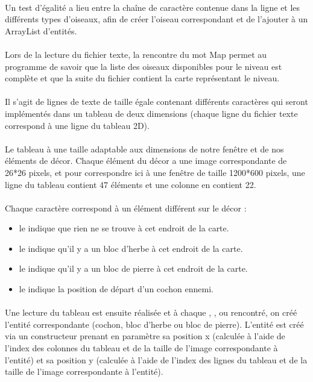 \documentclass[a4paper,12pt]{report}
\begin{document}
\paragraph{}Un test d’égalité a lieu entre la chaîne de caractère contenue dans la ligne et les différents types d’oiseaux, afin de créer l’oiseau correspondant et de l’ajouter à un ArrayList d’entités.
\paragraph{}Lors de la lecture du fichier texte, la rencontre du mot \guillemotleft Map \guillemotright permet au programme de savoir que la liste des oiseaux disponibles pour le niveau est complète et que la suite du fichier contient la carte représentant le niveau.
\paragraph{}Il s’agit de lignes de texte de taille égale contenant différents caractères qui seront implémentés dans un tableau de deux dimensions (chaque ligne du fichier texte correspond à une ligne du tableau 2D).
\paragraph{}Le tableau à une taille adaptable aux dimensions de notre fenêtre et de nos éléments de décor. Chaque élément du décor a une image correspondante de 26*26 pixels, et pour correspondre ici à une fenêtre de taille 1200*600 pixels, une ligne du tableau contient 47 éléments et une colonne en contient 22.
\paragraph{}Chaque caractère correspond à un élément différent sur le décor :
\begin{itemize}
\item le  \guillemotright indique que rien ne se trouve à cet endroit de la carte.
\item le  \guillemotright indique qu’il y a un bloc d’herbe à cet endroit de la carte.
\item le  \guillemotright indique qu’il y a un bloc de pierre à cet endroit de la carte.
\item le  \guillemotright indique la position de départ d’un cochon ennemi.
\end{itemize}
\paragraph{}Une lecture du tableau est ensuite réalisée et à chaque  \guillemotright,  \guillemotright, ou  \guillemotright rencontré, on créé l'entité correspondante (cochon, bloc d'herbe ou bloc de pierre). L'entité est créé via un constructeur prenant en paramètre sa position x (calculée à l'aide de l'index des colonnes du tableau et de la taille de l'image correspondante à l'entité) et sa position y (calculée à l'aide de l'index des lignes du tableau et de la taille de l'image correspondante à l'entité).
\end{document}
